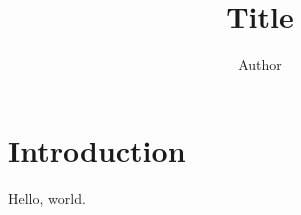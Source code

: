 \documentclass[11pt]{article}
\title{Title}
\author{Author}
\date{}
\begin{document}
\maketitle

\section{Introduction}

Hello, world.
\end{document}
